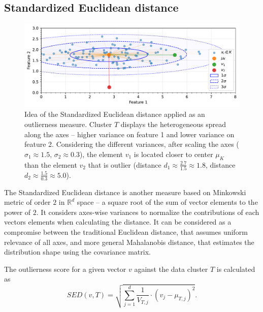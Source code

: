\subsection{Standardized Euclidean distance}
\label{section:SEuclidean}

\begin{figure}[t]
    \centering
    \includegraphics[width=\textwidth]{images/measures/seuclidean-distance.pdf}
    \caption{Idea of the Standardized Euclidean distance applied as an outlierness measure.
             Cluster $T$ displays the heterogeneous spread along the axes – higher variance
             on feature 1 and lower variance on feature 2. Considering the different variances,
             after scaling the axes ($\sigma_1 \approx 1.5$, $\sigma_2 \approx 0.3$),
             the element $v_1$ is located closer to center $\mu_K$ than the element $v_2$
             that is outlier (distance $d_1 \approx \frac{2.7}{1.5} \approx 1.8$,
             distance $d_2 \approx \frac{1.5}{0.3} \approx 5.0$).}
    \label{fig:sed-idea}
\end{figure}

The Standardized Euclidean distance is another measure based on Minkowski metric of order $2$ in $\mathbb{R}^d$ space – a square root of the sum of vector elements to the power of $2$. It considers axes-wise variances to normalize the contributions of each vectors elements when calculating the distance. It can be considered as a compromise between the traditional Euclidean distance, that assumes uniform relevance of all axes, and more general Mahalanobis distance, that estimates the distribution shape using the covariance matrix.

The outlierness score for a given vector $v$ against the data cluster $T$ is calculated as
\begin{equation}
    SED(v, T) = \sqrt{
        \sum_{j=1}^{d}
        \frac{1}{V_{T,j}}
        \cdot
        \left(
            v_{j} - \mu_{T,j}
        \right)^2
    }.
    \label{eq:sed}
\end{equation}

